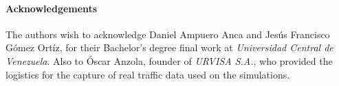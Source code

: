 \paragraph{Acknowledgements}
The authors wish to acknowledge Daniel Ampuero Anca and Jesús Francisco Gómez Ortíz, for their Bachelor's degree final work at \emph{Universidad Central de Venezuela}. Also to Óscar Anzola, founder of \emph{URVISA S.A.}, who provided the logistics for the capture of real traffic data used on the simulations.

